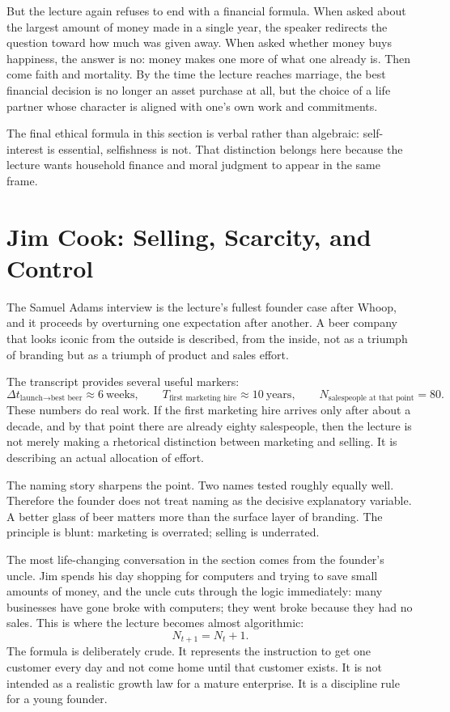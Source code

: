 But the lecture again refuses to end with a financial formula. When asked about the largest amount of money made in a single year, the speaker redirects the question toward how much was given away. When asked whether money buys happiness, the answer is no: money makes one more of what one already is. Then come faith and mortality. By the time the lecture reaches marriage, the best financial decision is no longer an asset purchase at all, but the choice of a life partner whose character is aligned with one's own work and commitments.

The final ethical formula in this section is verbal rather than algebraic: self-interest is essential, selfishness is not. That distinction belongs here because the lecture wants household finance and moral judgment to appear in the same frame.

\section{Jim Cook: Selling, Scarcity, and Control}

The Samuel Adams interview is the lecture's fullest founder case after Whoop, and it proceeds by overturning one expectation after another. A beer company that looks iconic from the outside is described, from the inside, not as a triumph of branding but as a triumph of product and sales effort.

The transcript provides several useful markers:
\begin{equation}
\Delta t_{\text{launch}\to\text{best beer}} \approx 6\ \text{weeks},
\qquad
T_{\text{first marketing hire}} \approx 10\ \text{years},
\qquad
N_{\text{salespeople at that point}} = 80.
\end{equation}
These numbers do real work. If the first marketing hire arrives only after about a decade, and by that point there are already eighty salespeople, then the lecture is not merely making a rhetorical distinction between marketing and selling. It is describing an actual allocation of effort.

The naming story sharpens the point. Two names tested roughly equally well. Therefore the founder does not treat naming as the decisive explanatory variable. A better glass of beer matters more than the surface layer of branding. The principle is blunt: marketing is overrated; selling is underrated.

The most life-changing conversation in the section comes from the founder's uncle. Jim spends his day shopping for computers and trying to save small amounts of money, and the uncle cuts through the logic immediately: many businesses have gone broke with computers; they went broke because they had no sales. This is where the lecture becomes almost algorithmic:
\begin{equation}
N_{t+1}=N_t+1.
\end{equation}
The formula is deliberately crude. It represents the instruction to get one customer every day and not come home until that customer exists. It is not intended as a realistic growth law for a mature enterprise. It is a discipline rule for a young founder.

